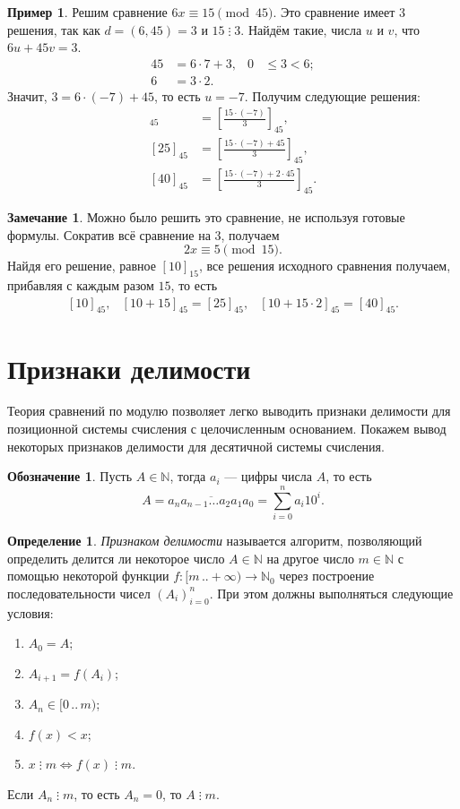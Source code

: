 \documentclass[14pt, a4paper]{extarticle}
\theoremstyle{definition}
\newtheorem*{definition}{Определение}
\newtheorem*{remark}{Замечание}
\newtheorem*{desig}{Обозначение}
\newtheorem{example}{Пример}
\newcommand{\divisible}{\mathop{\vdots}}
\begin{document}
	\begin{example}
		Решим сравнение $6x\equiv15\pmod{45}$. Это сравнение имеет $3$ решения, так как $d=(6,45)=3$ и $15\divisible3$. Найдём такие, числа $u$ и $v$, что $6u+45v=3$.
		\begin{align*}
			45&=6\cdot7+3,&0&\leqslant3<6;\\
			6&=3\cdot2.
		\end{align*}
		Значит, $3=6\cdot(-7)+45$, то есть $u=-7$. Получим следующие решения:
		\begin{align*}
			[10]_{45}&=\left[\frac{15\cdot(-7)}{3}\right]_{45},\\
			[25]_{45}&=\left[\frac{15\cdot(-7)+45}{3}\right]_{45},\\
			[40]_{45}&=\left[\frac{15\cdot(-7)+2\cdot45}{3}\right]_{45}.
		\end{align*}
	\end{example}
	
	\begin{remark}
		Можно было решить это сравнение, не используя готовые формулы. Сократив всё сравнение на $3$, получаем
		$$2x\equiv5\pmod{15}.$$
		Найдя его решение, равное $[10]_{15}$, все решения исходного сравнения получаем, прибавляя с каждым разом $15$, то есть
		$$\begin{array}{ccc}
			[10]_{45},&[10+15]_{45}=[25]_{45},&[10+15\cdot2]_{45}=[40]_{45}.
		\end{array}$$
	\end{remark}

\newpage
\section{Признаки делимости}

	Теория сравнений по модулю позволяет легко выводить признаки делимости для позиционной системы счисления с целочисленным основанием. Покажем вывод некоторых признаков делимости для десятичной системы счисления.

	\begin{desig}
		Пусть $A\in\mathbb{N}$, тогда $a_i$ --- цифры числа $A$, то есть
		$$A=\overline{a_na_{n-1}\dots a_2a_1a_0}=\sum_{i=0}^na_i10^i.$$
	\end{desig}

	\begin{definition}
		\emph{Признаком делимости} называется алгоритм, позволяющий определить делится ли некоторое число $A\in\mathbb{N}$ на другое число $m\in\mathbb{N}$ с помощью некоторой функции $f\colon[m\,..+\infty)\to\mathbb{N}_0$ через построение последовательности чисел $(A_i)_{i=0}^n$. При этом должны выполняться следующие условия:
		\begin{enumerate}[topsep=0pt,itemsep=-1ex,partopsep=1ex,parsep=1ex]
			\item $A_0=A$;
			\item $A_{i+1}=f(A_i)$;
			\item $A_n\in[0\,..\,m)$;
			\item $f(x)<x$;
			\item $x\divisible m\Leftrightarrow f(x)\divisible m$.
		\end{enumerate}
		Если $A_n\divisible m$, то есть $A_n=0$, то $A\divisible m$.
	\end{definition}
\end{document}
